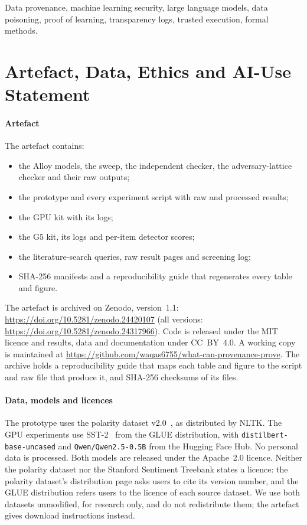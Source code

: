 \documentclass[journal,10pt]{IEEEtran}
\theoremstyle{definition}
\begin{document}
\begin{IEEEkeywords}
Data provenance, machine learning security, large language models, data poisoning,
proof of learning, transparency logs, trusted execution, formal methods.
\end{IEEEkeywords}









\section{Artefact, Data, Ethics and AI-Use Statement}\label{sec:artefact}
\paragraph{Artefact}
The artefact contains:
\begin{itemize}
\item the Alloy models, the sweep, the independent checker, the adversary-lattice checker and
  their raw outputs;
\item the prototype and every experiment script with raw and processed results;
\item the GPU kit with its logs;
\item the G5 kit, its logs and per-item detector scores;
\item the literature-search queries, raw result pages and screening log;
\item SHA-256 manifests and a reproducibility guide that regenerates every table and figure.
\end{itemize}
The artefact is archived on Zenodo, version~1.1:
\url{https://doi.org/10.5281/zenodo.24420107} (all versions:
\url{https://doi.org/10.5281/zenodo.24317966}). Code is released under the MIT licence and
results, data and documentation under CC~BY~4.0. A working copy is maintained at
\url{https://github.com/waqas6755/what-can-provenance-prove}. The archive holds a reproducibility
guide that maps each table and figure to the script and raw file that produce it, and SHA-256
checksums of its files.

\paragraph{Data, models and licences}
The prototype uses the polarity dataset v2.0~\cite{pang2004sentimental}, as distributed by
NLTK. The GPU experiments use SST-2~\cite{socher2013sst} from the GLUE distribution, with
\texttt{distilbert-base-uncased} and \texttt{Qwen/Qwen2.5-0.5B} from the Hugging Face Hub. No
personal data is processed. Both models are released under the Apache~2.0 licence. Neither the
polarity dataset nor the Stanford Sentiment Treebank states a licence: the polarity dataset's
distribution page asks users to cite its version number, and the GLUE distribution refers users to
the licence of each source dataset. We use both datasets unmodified, for research only, and do not
redistribute them; the artefact gives download instructions instead.
\end{document}
